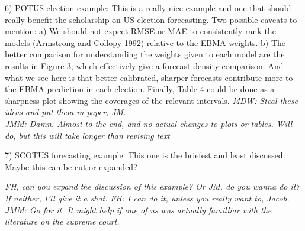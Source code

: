 \documentclass[10pt]{article}
\begin{document}
6) POTUS election example: This is a really nice example and one that should really benefit the scholarship on US election forecasting. Two possible caveats to mention: a) We should not expect RMSE or MAE to consistently rank the models (Armstrong and Collopy 1992) relative to the EBMA weights.   b) The better comparison for understanding the weights given to each model are the results in Figure 3, which effectively give a forecast density comparison.   And what we see here is that better calibrated, sharper forecasts contribute more to the EBMA prediction in each election.  Finally, Table 4 could be done as a sharpness plot showing the coverages of the relevant intervals.
{\it MDW: Steal these ideas and put them in paper, JM.}\\
{\it JMM: Damn.  Almost to the end, and no actual changes to plots or tables.  Will do, but this will take longer than revising text}


7) SCOTUS forecasting example: This one is the briefest and least discussed.  Maybe this can be cut or expanded?

{\it FH, can you expand the discussion of this example? Or JM, do you wanna do it?  If neither, I'll give it a shot.}
{\it FH: I can do it, unless you really want to, Jacob.}
{\it JMM: Go for it.  It might help if one of us was actually familliar with the literature on the supreme court.}
\end{document}
